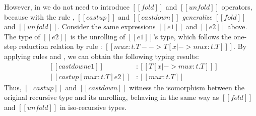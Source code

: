 However, in \ecore we do not need to introduce $[[fold]]$ and
$[[unfold]]$ operators, because with the rule ,
$[[castup]]$ and $[[castdown]]$ \emph{generalize} $[[fold]]$ and $[[unfold]]$.
Consider the same expressions $[[e1]]$ and $[[e2]]$ above. The type of
$[[e2]]$ is the unrolling of $[[e1]]$'s type, which follows the
one-step reduction relation by rule :
$ [[mu x:t.T --> T [x |-> mu x:t.T] ]]$.
By applying rules  and , we
can obtain the following typing results:
\[\begin{array}{lll}
  &[[castdown e1]] &: [[T [x |-> mu x:t.T] ]]\\
  &[[castup [mu x:t.T] e2]] &: [[mu x:t.T]]
\end{array}\]
Thus, $[[castup]]$ and $[[castdown]]$ witness the isomorphism between
the original recursive type and its unrolling, behaving in the
same way
as $[[fold]]$ and $[[unfold]]$ in iso-recursive types.
\begin{comment}
\begin{align*}
  [[mu x:t.T]] \xrightleftharpoons[{[[castup]]~[ [[mu x:t.T]]
  ]}]{[[castdown]]} [[T[x |-> mu x:t.T] ]]
\end{align*}
\end{comment}

\begin{comment}
\paragraph{Casts and Recursive Types}
Figure \ref{fig:ecore:syntax} shows that $[[castup]]$ is a \emph{value} that cannot be further reduced 
during the evaluation. It follows the convention of $[[fold]]$ in iso-recursive types~\cite{Vanderwaart:2003ik}.
But too many $[[castup]]$ constructs left for code generation will
increase the size of the program and cause runtime overhead.
Actually, $[[castup]]$ constructs can be safely erased after type checking:
they are \emph{computationally irrelevant} and do not actually 
transform a term other than changing its type.
\end{comment}


